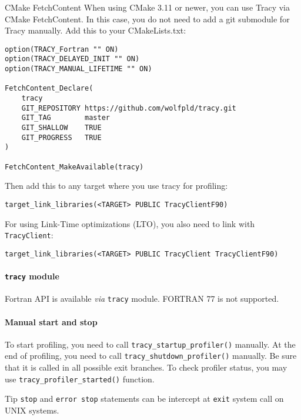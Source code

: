 \documentclass[hidelinks,titlepage,a4paper,twoside]{article}
\begin{document}
\begin{bclogo}[
noborder=true,
couleur=black!5,
logo=\bclampe
]{CMake FetchContent}
When using CMake 3.11 or newer, you can use Tracy via CMake FetchContent. In this case, you do not need to add a git submodule for Tracy manually. Add this to your CMakeLists.txt:

\begin{lstlisting}
option(TRACY_Fortran "" ON)
option(TRACY_DELAYED_INIT "" ON)
option(TRACY_MANUAL_LIFETIME "" ON)

FetchContent_Declare(
    tracy
    GIT_REPOSITORY https://github.com/wolfpld/tracy.git
    GIT_TAG        master
    GIT_SHALLOW    TRUE
    GIT_PROGRESS   TRUE
)

FetchContent_MakeAvailable(tracy)
\end{lstlisting}

Then add this to any target where you use tracy for profiling:

\begin{lstlisting}
target_link_libraries(<TARGET> PUBLIC TracyClientF90)
\end{lstlisting}

For using Link-Time optimizations (LTO), you also need to link with \texttt{TracyClient}:

\begin{lstlisting}
target_link_libraries(<TARGET> PUBLIC TracyClient TracyClientF90)
\end{lstlisting}
\end{bclogo}

\paragraph{\texttt{tracy} module}

Fortran API is available \textit{via} \texttt{tracy} module. FORTRAN 77 is not supported.

\paragraph{Manual start and stop}

To start profiling, you need to call \texttt{tracy\_startup\_profiler()} manually.
At the end of profiling, you need to call \texttt{tracy\_shutdown\_profiler()} manually.
Be sure that it is called in all possible exit branches.
To check profiler status, you may use \texttt{tracy\_profiler\_started()} function.

\begin{bclogo}[
noborder=true,
couleur=black!5,
logo=\bcbombe
]{Tip}
\texttt{stop} and \texttt{error stop} statements can be intercept at \texttt{exit} system call on UNIX systems.
\end{bclogo}
\end{document}
